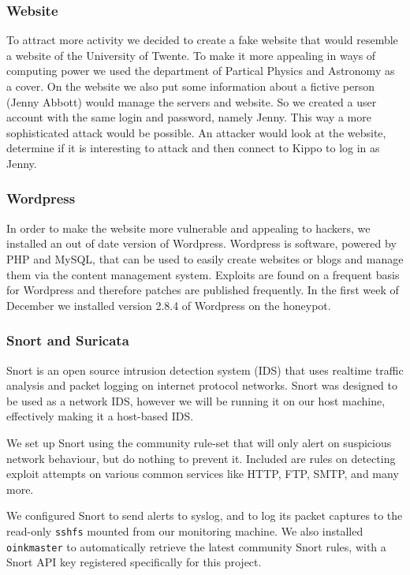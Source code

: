\documentclass[11pt]{article}
\begin{document}
\subsubsection{Website}
To attract more activity we decided to create a fake website that would resemble a website of the University of Twente. To make it more appealing in ways of computing power we used the department of Partical Physics and Astronomy as a cover.
On the website we also put some information about a fictive person (Jenny Abbott) would manage the servers and website. So we created a user account with the same login and password, namely Jenny. This way a more sophisticated attack would be possible. An attacker would look at the website, determine if it is interesting to attack and then connect to Kippo to log in as Jenny.

\subsubsection{Wordpress}
In order to make the website more vulnerable and appealing to hackers, we installed an out of date version of Wordpress. Wordpress is software, powered by PHP and MySQL, that can be used to easily create websites or blogs and manage them via the content management system. Exploits are found on a frequent basis for Wordpress and therefore patches are published frequently. In the first week of December we installed version 2.8.4 of Wordpress on the honeypot.

\subsubsection{Snort and Suricata}
Snort is an open source intrusion detection system (IDS) that uses realtime traffic analysis and packet logging on internet protocol networks.
Snort was designed to be used as a network IDS, however we will be running it on our host machine, effectively making it a host-based IDS.

We set up Snort using the community rule-set that will only alert on suspicious network behaviour, but do nothing to prevent it. 
Included are rules on detecting exploit attempts on various common services like HTTP, FTP, SMTP, and many more.

We configured Snort to send alerts to syslog, and to log its packet captures to the read-only \verb|sshfs| mounted from our monitoring machine.
We also installed \verb|oinkmaster| to automatically retrieve the latest community Snort rules, with a Snort API key registered specifically for this project.
\end{document}
